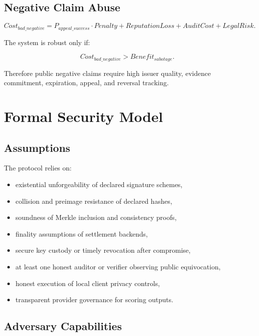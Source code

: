\documentclass[11pt]{article}
\begin{document}
\subsection{Negative Claim Abuse}

\begin{equation}
Cost_{bad\_negative}=P_{appeal\_success}\cdot Penalty+ReputationLoss+AuditCost+LegalRisk.
\end{equation}

The system is robust only if:

\begin{equation}
Cost_{bad\_negative}>Benefit_{sabotage}.
\end{equation}

Therefore public negative claims require high issuer quality, evidence commitment, expiration, appeal, and reversal tracking.

\section{Formal Security Model}

\subsection{Assumptions}

The protocol relies on:

\begin{itemize}
    \item existential unforgeability of declared signature schemes,
    \item collision and preimage resistance of declared hashes,
    \item soundness of Merkle inclusion and consistency proofs,
    \item finality assumptions of settlement backends,
    \item secure key custody or timely revocation after compromise,
    \item at least one honest auditor or verifier observing public equivocation,
    \item honest execution of local client privacy controls,
    \item transparent provider governance for scoring outputs.
\end{itemize}

\subsection{Adversary Capabilities}
\end{document}
